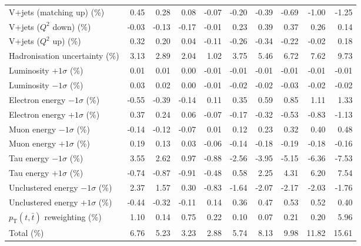 \begin{table}[htbp]
{\begin{tabular}{lrrrrrrrrr}
V+jets (matching up) (\%) & 0.45 & 0.28 & 0.08 & -0.07 & -0.20 & -0.39 & -0.69 & -1.00 & -1.25 \\ 
V+jets ($Q^{2}$ down) (\%) & -0.03 & -0.13 & -0.17 & -0.01 & 0.23 & 0.39 & 0.37 & 0.26 & 0.14 \\ 
V+jets ($Q^{2}$ up) (\%) & 0.32 & 0.20 & 0.04 & -0.11 & -0.26 & -0.34 & -0.22 & -0.02 & 0.18 \\ 
Hadronisation uncertainty (\%) & 3.13 & 2.89 & 2.04 & 1.02 & 3.75 & 5.46 & 6.72 & 7.62 & 9.73 \\ 
Luminosity $+1\sigma$ (\%) & 0.01 & 0.01 & 0.00 & -0.01 & -0.01 & -0.01 & -0.01 & -0.01 & -0.01 \\ 
Luminosity $-1\sigma$ (\%) & 0.03 & 0.02 & 0.00 & -0.01 & -0.02 & -0.02 & -0.03 & -0.02 & -0.02 \\ 
Electron energy $-1\sigma$ (\%) & -0.55 & -0.39 & -0.14 & 0.11 & 0.35 & 0.59 & 0.85 & 1.11 & 1.33 \\ 
Electron energy $+1\sigma$ (\%) & 0.37 & 0.24 & 0.06 & -0.07 & -0.17 & -0.32 & -0.53 & -0.83 & -1.13 \\ 
Muon energy $-1\sigma$ (\%) & -0.14 & -0.12 & -0.07 & 0.01 & 0.12 & 0.23 & 0.32 & 0.40 & 0.48 \\ 
Muon energy $+1\sigma$ (\%) & 0.19 & 0.13 & 0.03 & -0.06 & -0.14 & -0.18 & -0.19 & -0.18 & -0.16 \\ 
Tau energy $-1\sigma$ (\%) & 3.55 & 2.62 & 0.97 & -0.88 & -2.56 & -3.95 & -5.15 & -6.36 & -7.53 \\ 
Tau energy $+1\sigma$ (\%) & -0.74 & -0.87 & -0.91 & -0.48 & 0.58 & 2.25 & 4.31 & 6.20 & 7.54 \\ 
Unclustered energy $-1\sigma$ (\%) & 2.37 & 1.57 & 0.30 & -0.83 & -1.64 & -2.07 & -2.17 & -2.03 & -1.76 \\ 
Unclustered energy $+1\sigma$ (\%) & -0.44 & -0.32 & -0.11 & 0.14 & 0.36 & 0.47 & 0.53 & 0.52 & 0.40 \\ 
$p_\mathrm{T}(t,\bar{t})$ reweighting (\%) & 1.10 & 0.14 & 0.75 & 0.22 & 0.10 & 0.07 & 0.21 & 0.20 & 5.96 \\ 
\hline 
Total (\%) & 6.76  & 5.23  & 3.23  & 2.88  & 5.74  & 8.13  & 9.98  & 11.82  & 15.61 \\ 
\hline 
\end{tabular}
}
\end{table}
